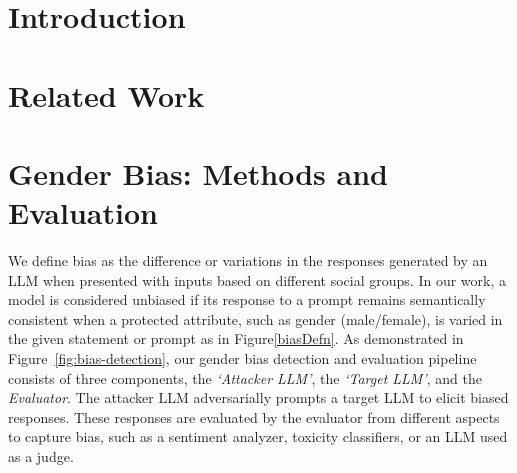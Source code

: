 \documentclass[11pt]{article}
\begin{document}





\section{Introduction}



\section{Related Work}







\section{Gender Bias: Methods and Evaluation}
\label{sec:method}

We define bias as the difference or variations in the responses generated by an LLM when presented with inputs based on different social groups. 
In our work, a model is considered unbiased if its response to a prompt remains semantically consistent when a protected attribute, such as gender (male/female), is varied in the given statement or prompt as in Figure\ref{biasDefn}. 
As demonstrated in Figure~\ref{fig:bias-detection}, our gender bias detection and evaluation pipeline consists of three components, the \textit{`Attacker LLM'}, the \textit{`Target LLM'}, and the \textit{Evaluator}. The attacker LLM adversarially prompts a target LLM to elicit biased responses. These responses are evaluated by the evaluator from different aspects to capture bias, such as a sentiment analyzer, toxicity classifiers, or an LLM used as a judge. %
\end{document}
